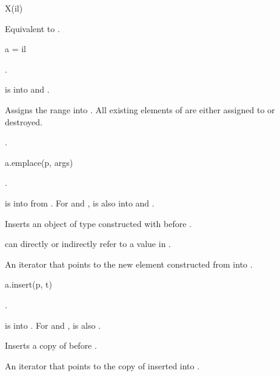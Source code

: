 \begin{itemdecl}
X(il)
\end{itemdecl}

\begin{itemdescr}
\pnum
\effects
Equivalent to .
\end{itemdescr}

\begin{itemdecl}
a = il
\end{itemdecl}

\begin{itemdescr}
\pnum
\result
{}.

\pnum
\expects
{} is  into  and
.

\pnum
\effects
Assigns the range  into .
All existing elements of  are either assigned to or destroyed.

\pnum
\returns
{}.
\end{itemdescr}

%
\begin{itemdecl}
a.emplace(p, args)
\end{itemdecl}

\begin{itemdescr}
\pnum
\result
{}.

\pnum
\expects
{} is  into  from .
For  and ,
 is also  into  and
.

\pnum
\effects
Inserts an object of type 
constructed with 
before .
\begin{note}
 can directly or indirectly refer to a value in .
\end{note}

\pnum
\returns
An iterator that points to
the new element constructed from  into .
\end{itemdescr}

%
\begin{itemdecl}
a.insert(p, t)
\end{itemdecl}

\begin{itemdescr}
\pnum
\result
{}.

\pnum
\expects
{} is  into .
For  and ,
 is also .

\pnum
\effects
Inserts a copy of  before .

\pnum
\returns
An iterator that points to the copy of  inserted into .
\end{itemdescr}

